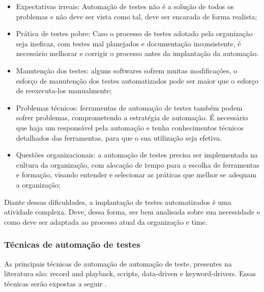 \begin{itemize}
	\item Expectativas irreais: Automação de testes não é a solução de todos os
problemas e não deve ser vista como tal, deve ser encarada de forma realista;
	\item Prática de testes pobre: Caso o processo de testes adotado pela organização seja ineficaz, com testes mal planejados e documentação inconsistente, é necessário melhorar e corrigir o processo antes da implantação da automação.
	\item Manutenção dos testes: alguns softwares sofrem muitas modificações, o esforço de manutenção dos testes automatizados pode ser maior que o esforço de reexecuta-los manualmente;
	\item Problemas técnicos:  ferramentas de automação de testes também podem sofrer problemas, comprometendo a estratégia de automação. É necessário que haja um responsável  pela automação e tenha conhecimentos técnicos detalhados das ferramentas, para que o sua utilização seja efetiva.
	\item Questões organizacionais: a automação de testes precisa ser implementada na cultura da organização, com alocação de tempo para a escolha de ferramentas e formação, visando entender e selecionar as práticas que melhor se adequam a organização;
\end{itemize}

Diante dessas dificuldades, a implantação de testes automatizados é uma atividade complexa. Deve, dessa forma, ser bem analisada sobre sua necessidade e como deve ser adaptada ao processo atual da organização e time.

\subsubsection{Técnicas de automação de testes}

As principais técnicas de automação de automação de teste, presentes na literatura são: record and playback, scripts, data-driven e keyword-drivers. Essas técnicas serão expostas a seguir \cite{Fantinato2004}.

